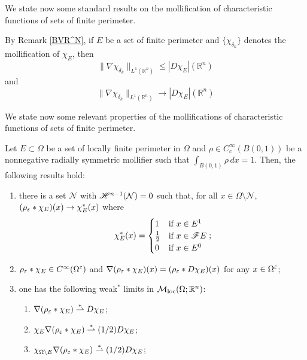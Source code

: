 
We state now some standard results on the mollification of characteristic functions of sets of finite perimeter.

\begin{remark} \label{chargradbound} By Remark \ref{BVR^N}, if $E$ be a set of finite perimeter and $\{ \chi_{\delta_{k}} \}$ denotes the mollification of $\chi_{E}$, then
\[ \|\nabla \chi_{\delta_{k}}\|_{L^{1}(\mathbb{R}^{n})} \le |D \chi_{E}|(\mathbb{R}^{n}) \]
and
\[ \|\nabla \chi_{\delta_{k}}\|_{L^{1}(\mathbb{R}^{n})} \to |D \chi_{E}|(\mathbb{R}^{n}) \]
\end{remark}

We state now some relevant properties of the mollifications of characteristic functions of sets of finite perimeter.

\begin{lemma} \label{mollcharconv} Let $E \subset \Omega$ be a set of locally finite perimeter in $\Omega$ and $\rho \in C^{\infty}_{c}(B(0, 1))$ be a nonnegative radially symmetric mollifier such that $\int_{B(0, 1)} \rho \, dx = 1$. Then, the following results hold:
\begin{enumerate}
	\item there is a set $\mathcal{N}$ with $\mathscr{H}^{n - 1}(\mathcal{N}) = 0$ such that, for all $x \in \Omega \setminus \mathcal{N}$, $(\rho_{\varepsilon} \ast \chi_{E})(x) \to \chi_{E}^{*}(x)$ where
\begin{equation}\label{PRChi}
 \chi_{E}^{*}(x) = \begin{cases} 1  &  \mbox{if} \ x \in E^{1} \\ \frac{1}{2} &  \mbox{if} \ x \in \mathscr{F} E \\ 0 &  \mbox{if} \ x \in E^{0} \end{cases} ;
\end{equation}
\item $\rho_{\varepsilon} \ast \chi_{E} \in C^{\infty}(\Omega^{\varepsilon})$ and $\nabla (\rho_{\varepsilon} \ast \chi_{E})(x) = (\rho_{\varepsilon} \ast D \chi_{E})(x)$ for any $x \in \Omega^{\varepsilon}$;
\item one has the following weak$^*$ limits in $\mathcal{M}_{\rm loc}(\Omega; \mathbb{R}^{n})$:
\begin{enumerate}
		\item $\nabla (\rho_{\varepsilon} \ast \chi_{E}) \overset{*}{\rightharpoonup} D\chi_{E}$;
		\item $\chi_{E} \nabla (\rho_{\varepsilon} \ast \chi_{E}) \overset{*}{\rightharpoonup} (1/2) D \chi_{E}$;
		\item $\chi_{\Omega \setminus E} \nabla (\rho_{\varepsilon} \ast \chi_{E}) \overset{*}{\rightharpoonup} (1/2) D \chi_{E}$;
\end{enumerate}
\end{enumerate}
\end{lemma}




